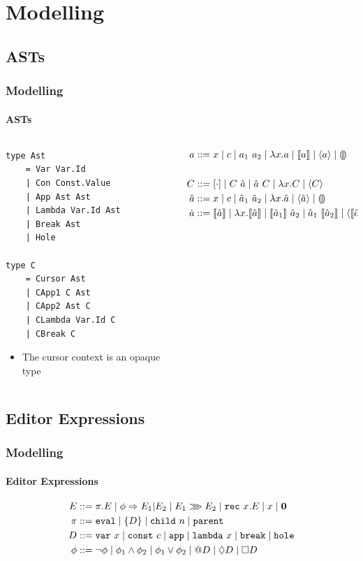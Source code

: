 \documentclass{beamer}
\begin{document}
\section{Modelling}

\subsection{ASTs}

\begin{frame}[fragile]
    \frametitle{Modelling}
    \framesubtitle{ASTs}

    \begin{columns}
        \begin{column}{0.5\textwidth}
\begin{lstlisting}[basicstyle=\scriptsize]
type Ast
    = Var Var.Id
    | Con Const.Value
    | App Ast Ast
    | Lambda Var.Id Ast
    | Break Ast
    | Hole

type C
    = Cursor Ast
    | CApp1 C Ast
    | CApp2 Ast C
    | CLambda Var.Id C
    | CBreak C
\end{lstlisting}
            \begin{itemize}
                \item The cursor context is an opaque type
            \end{itemize}
        \end{column}

        \begin{column}{0.5\textwidth}
            \begin{align*}
                \Ast \\\\ \C \\ \aHat \\ \aDot
            \end{align*}
        \end{column}
    \end{columns}
\end{frame}

\subsection{Editor Expressions}

\begin{frame}
    \frametitle{Modelling}
    \framesubtitle{Editor Expressions}

    \begin{definition}
        \begin{align*}
            \Edt \\ \Aep \\ \Aam \\ \Eed
        \end{align*}
    \end{definition}
\end{frame}
\end{document}
